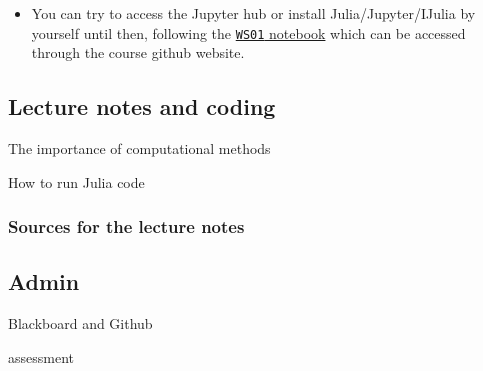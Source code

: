 \documentclass[12pt,landscape]{article}
\begin{document}
{\begin{itemize}
\item You can try to access the Jupyter hub or install Julia/Jupyter/IJulia by yourself until then, following the \href{WS01-Installing-Julia.ipynb}{\texttt{WS01} notebook} which can be accessed through the course github website.

\end{itemize}
\subsection{Lecture notes and coding}
The importance of computational methods

How to run Julia code

\subsubsection{Sources for the lecture notes}
\subsection{Admin}
Blackboard and Github

assessment


\begin{lstlisting}

\end{lstlisting}


}
\end{document}

